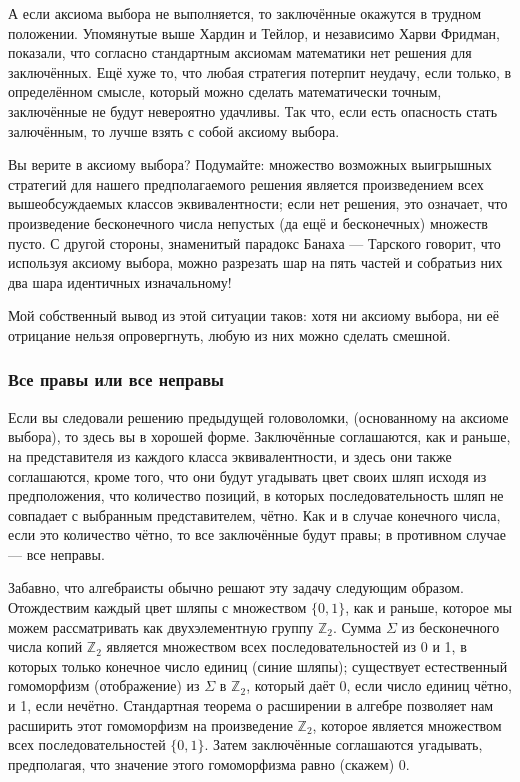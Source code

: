 А если аксиома выбора не выполняется, то заключённые окажутся в трудном положении.
Упомянутые выше Хардин и Тейлор, и независимо Харви Фридман, показали, что согласно стандартным аксиомам математики нет решения для заключённых.
Ещё хуже то, что любая стратегия потерпит неудачу, если только, в определённом смысле, который можно сделать математически точным, заключённые не будут невероятно удачливы.
Так что, если есть опасность стать залючённым, то лучше взять с собой аксиому выбора.

Вы верите в аксиому выбора?
Подумайте: множество возможных выигрышных стратегий для нашего предполагаемого решения является произведением всех вышеобсуждаемых классов эквивалентности; если нет решения, это означает, что произведение бесконечного числа непустых (да ещё и бесконечных) множеств пусто.
С другой стороны, знаменитый парадокс Банаха --- Тарского говорит, что используя аксиому выбора, можно разрезать шар на пять частей и собратьиз них два шара идентичных изначальному!

Мой собственный вывод из этой ситуации таков: хотя ни аксиому выбора, ни её отрицание нельзя опровергнуть, любую из них можно сделать смешной.


\subsubsection*{Все правы или все неправы}

Если вы следовали решению предыдущей головоломки, (основанному на аксиоме выбора), то здесь вы в хорошей форме. Заключённые соглашаются, как и раньше, на представителя из каждого класса эквивалентности, и здесь они также соглашаются, кроме того, что они будут угадывать цвет своих шляп исходя из предположения, что количество позиций, в которых последовательность шляп не совпадает с выбранным представителем, чётно.
Как и в случае конечного числа, если это количество чётно, то все заключённые будут правы; в противном случае --- все неправы.

Забавно, что алгебраисты обычно решают эту задачу следующим образом.
Отождествим каждый цвет шляпы с множеством $\{0, 1\}$, как и раньше, которое мы можем рассматривать как двухэлементную группу $\mathbb{Z}_2$.
Сумма $\Sigma$ из бесконечного числа копий $\mathbb{Z}_2$ является множеством всех последовательностей из 0 и 1, в которых только конечное число единиц (синие шляпы); существует естественный гомоморфизм (отображение) из $\Sigma$ в $\mathbb{Z}_2$, который даёт 0, если число единиц чётно, и 1, если нечётно.
Стандартная теорема о расширении в алгебре позволяет нам расширить этот гомоморфизм на произведение $\mathbb{Z}_2$, которое является множеством всех последовательностей $\{0, 1\}$.
Затем заключённые соглашаются угадывать, предполагая, что значение этого гомоморфизма равно (скажем) 0.

